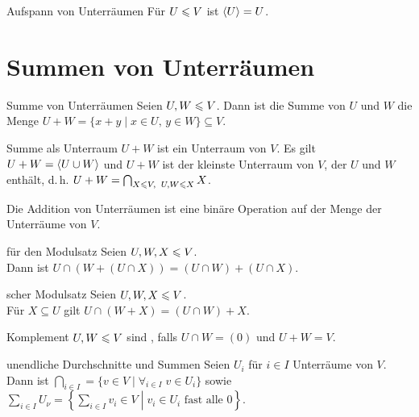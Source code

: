 \begin{Lemma}{Aufspann von Unterräumen}
    Für $U \leqslant V$ ist $\langle U \rangle = U$.
\end{Lemma}

\section{%
    Summen von Unterräumen%
}

\begin{Def}{Summe von Unterräumen}
    Seien $U, W \leqslant V$. Dann ist die Summe von $U$ und $W$ die Menge
    $U + W = \{x + y \;|\; x \in U,\, y \in W\} \subseteq V$.
\end{Def}

\begin{Satz}{Summe als Unterraum}
    $U + W$ ist ein Unterraum von $V$.
    Es gilt $U + W = \langle U \cup W \rangle$
    und $U + W$ ist der kleinste Unterraum von $V$, der $U$ und $W$ enthält,
    d.\,h. $U + W = \bigcap_{X \leqslant V,\;\; U, W \leqslant X} X$.
\end{Satz}

\begin{Kor}
    Die Addition von Unterräumen ist eine binäre Operation auf der Menge
    der Unterräume von $V$.
\end{Kor}

\pagebreak

\begin{Lemma}{für den Modulsatz}
    Seien $U, W, X \leqslant V$. \\
    Dann ist $U \cap (W + (U \cap X)) = (U \cap W) + (U \cap X)$.
\end{Lemma}

\begin{Satz}{scher Modulsatz}
    Seien $U, W, X \leqslant V$. \\
    Für $X \subseteq U$ gilt $U \cap (W + X) = (U \cap W) + X$.
\end{Satz}

\begin{Def}{Komplement}
    $U, W \leqslant V$ sind , falls
    $U \cap W = (0)$ und $U + W = V$.
\end{Def}

\begin{Def}{unendliche Durchschnitte und Summen}
    Seien $U_i$ für $i \in I$ Unterräume von $V$. \\
    Dann ist $\bigcap_{i \in I} =
    \{v \in V \;|\; \forall_{i \in I}\; v \in U_i\}$
    sowie $\sum_{i \in I} U_\nu =
    \left\{\left. \sum_{i \in I} v_i \in V \;\right|\;
    v_i \in U_i \text{ fast alle } 0 \right\}$.
\end{Def}

